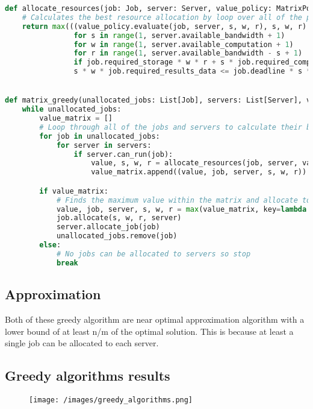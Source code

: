 \begin{lstlisting}[language=Python]
def allocate_resources(job: Job, server: Server, value_policy: MatrixPolicy):
    # Calculates the best resource allocation by loop over all of the possible allocations that satisfy the deadline constraint
    return max(((value_policy.evaluate(job, server, s, w, r), s, w, r)
                for s in range(1, server.available_bandwidth + 1)
                for w in range(1, server.available_computation + 1)
                for r in range(1, server.available_bandwidth - s + 1)
                if job.required_storage * w * r + s * job.required_computation * r +
                s * w * job.required_results_data <= job.deadline * s * w * r), key=lambda x: x[0])


def matrix_greedy(unallocated_jobs: List[Job], servers: List[Server], value_policy: MatrixPolicy):
    while unallocated_jobs:
        value_matrix = []
        # Loop through all of the jobs and servers to calculate their best resource allocation
        for job in unallocated_jobs:
            for server in servers:
                if server.can_run(job):
                    value, s, w, r = allocate_resources(job, server, value_policy)
                    value_matrix.append((value, job, server, s, w, r))

        if value_matrix:
            # Finds the maximum value within the matrix and allocate to job and server
            value, job, server, s, w, r = max(value_matrix, key=lambda x: x[0])
            job.allocate(s, w, r, server)
            server.allocate_job(job)
            unallocated_jobs.remove(job)
        else:
            # No jobs can be allocated to servers so stop
            break
\end{lstlisting}

\subsection{Approximation}\label{subsec:approximation}
Both of these greedy algorithm are near optimal approximation algorithm with a lower bound of at least n/m of the
optimal solution. This is because at least a single job can be allocated to each server.

\subsection{Greedy algorithms results}\label{subsec:greedy-algorithms-results}
\begin{figure}
\centering
    \texttt{[image: /images/greedy\_algorithms.png]}
\end{figure}
